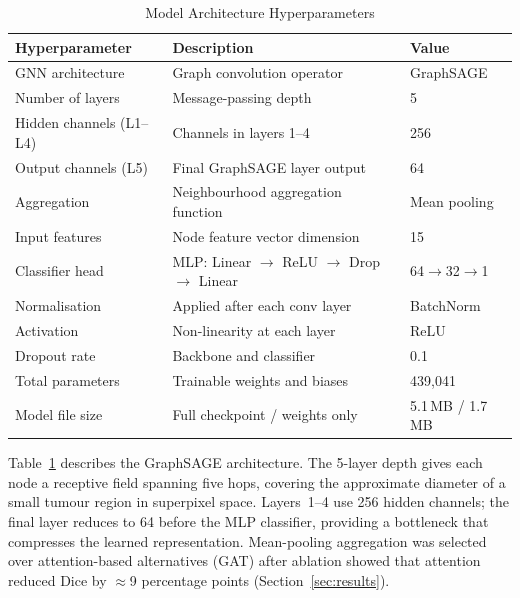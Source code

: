 \documentclass{article}
\begin{document}
\begin{table}[htbp]
\caption{Model Architecture Hyperparameters}
\label{tab:hyperparams}
\begin{center}
\begin{tabularx}{0.85\textwidth}{|l|X|l|}
\hline
\textbf{Hyperparameter} & \textbf{Description} & \textbf{Value} \\
\hline
GNN architecture & Graph convolution operator & GraphSAGE \cite{hamilton2017graphsage} \\
\hline
Number of layers & Message-passing depth & 5 \\
\hline
Hidden channels (L1--L4) & Channels in layers 1--4 & 256 \\
\hline
Output channels (L5) & Final GraphSAGE layer output & 64 \\
\hline
Aggregation & Neighbourhood aggregation function & Mean pooling \\
\hline
Input features & Node feature vector dimension & 15 \\
\hline
Classifier head & MLP: Linear $\to$ ReLU $\to$ Drop $\to$ Linear & 64$\to$32$\to$1 \\
\hline
Normalisation & Applied after each conv layer & BatchNorm \\
\hline
Activation & Non-linearity at each layer & ReLU \\
\hline
Dropout rate & Backbone and classifier & 0.1 \\
\hline
Total parameters & Trainable weights and biases & 439,041 \\
\hline
Model file size & Full checkpoint / weights only & 5.1\,MB / 1.7\,MB \\
\hline
\end{tabularx}
\end{center}
\end{table}

Table~\ref{tab:hyperparams} describes the GraphSAGE architecture. The 5-layer
depth gives each node a receptive field spanning five hops, covering the
approximate diameter of a small tumour region in superpixel space. Layers~1--4
use 256 hidden channels; the final layer reduces to 64 before the MLP classifier,
providing a bottleneck that compresses the learned representation. Mean-pooling
aggregation was selected over attention-based alternatives (GAT) after ablation
showed that attention reduced Dice by $\approx$9 percentage points
(Section~\ref{sec:results}).
\end{document}
